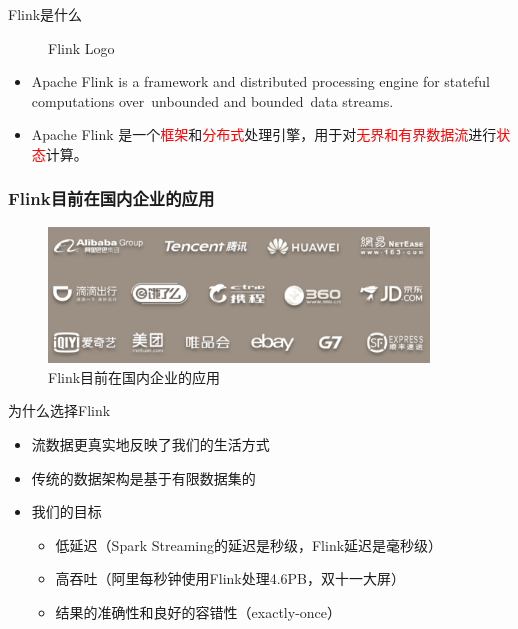 \documentclass{beamer}
\begin{document}
\begin{frame}{Flink是什么}
\begin{figure}
\begin{minipage}{0.45\textwidth}
            \caption{Flink Logo}
        \end{minipage}
    \end{figure}
    \begin{itemize}
      \item Apache Flink is a framework and distributed processing engine for stateful computations over unbounded and bounded data streams.
      \item Apache Flink 是一个\textcolor{red}{框架}和\textcolor{red}{分布式}处理引擎，用于对\textcolor{red}{无界和有界数据流}进行\textcolor{red}{状态}计算。
    \end{itemize}
  \end{frame}

  \begin{frame}
    \frametitle{Flink目前在国内企业的应用}
  
    \begin{figure}
      \centering
      \includegraphics[width=0.9\textwidth]{image3.png}
      \caption{Flink目前在国内企业的应用}
    \end{figure}
  
  \end{frame}

  \begin{frame}{为什么选择Flink}
    \begin{itemize}
      \item 流数据更真实地反映了我们的生活方式
      \item 传统的数据架构是基于有限数据集的
      \item 我们的目标
        \begin{itemize}
          \item 低延迟（Spark Streaming的延迟是秒级，Flink延迟是毫秒级）
          \item 高吞吐（阿里每秒钟使用Flink处理4.6PB，双十一大屏）
          \item 结果的准确性和良好的容错性（exactly-once）
        \end{itemize}
    \end{itemize}
  \end{frame}
\end{document}
